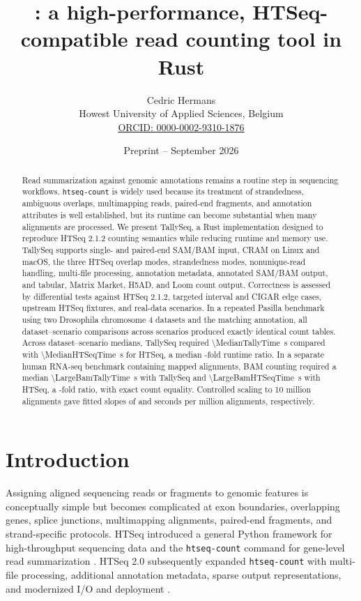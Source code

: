 \documentclass[11pt]{article}
\title{\tallyseq: a high-performance, HTSeq-compatible read counting tool in Rust}
\author{Cedric Hermans\\
Howest University of Applied Sciences, Belgium\\
\href{https://orcid.org/0000-0002-9310-1876}{ORCID: 0000-0002-9310-1876}}
\date{Preprint -- September 2026}
\begin{document}
\maketitle

\begin{abstract}
Read summarization against genomic annotations remains a routine step in sequencing workflows. \texttt{htseq-count} is widely used because its treatment of strandedness, ambiguous overlaps, multimapping reads, paired-end fragments, and annotation attributes is well established, but its runtime can become substantial when many alignments are processed. We present TallySeq, a Rust implementation designed to reproduce HTSeq 2.1.2 counting semantics while reducing runtime and memory use. TallySeq supports single- and paired-end SAM/BAM input, CRAM on Linux and macOS, the three HTSeq overlap modes, strandedness modes, nonunique-read handling, multi-file processing, annotation metadata, annotated SAM/BAM output, and tabular, Matrix Market, H5AD, and Loom count output. Correctness is assessed by differential tests against HTSeq 2.1.2, targeted interval and CIGAR edge cases, upstream HTSeq fixtures, and real-data scenarios. In a repeated Pasilla benchmark using two Drosophila chromosome 4 datasets and the matching annotation, all \BenchmarkExactScenarioCount{} dataset--scenario comparisons across \BenchmarkScenarioCount{} scenarios produced exactly identical count tables. Across dataset--scenario medians, TallySeq required \SI{\MedianTallyTime}{\second} compared with \SI{\MedianHTSeqTime}{\second} for HTSeq, a median \MedianSpeedup{}-fold runtime ratio. In a separate human RNA-seq benchmark containing \LargeAlignmentCount{} mapped alignments, BAM counting required a median \SI{\LargeBamTallyTime}{\second} with TallySeq and \SI{\LargeBamHTSeqTime}{\second} with HTSeq, a \LargeBamSpeedup{}-fold ratio, with exact count equality. Controlled scaling to 10 million alignments gave fitted slopes of \ScalingTallySlope{} and \ScalingHTSeqSlope{} seconds per million alignments, respectively.
\end{abstract}

\section{Introduction}

Assigning aligned sequencing reads or fragments to genomic features is conceptually simple but becomes complicated at exon boundaries, overlapping genes, splice junctions, multimapping alignments, paired-end fragments, and strand-specific protocols. HTSeq introduced a general Python framework for high-throughput sequencing data and the \texttt{htseq-count} command for gene-level read summarization \citep{Anders2015}. HTSeq 2.0 subsequently expanded \texttt{htseq-count} with multi-file processing, additional annotation metadata, sparse output representations, and modernized I/O and deployment \citep{Putri2022}.
\end{document}
